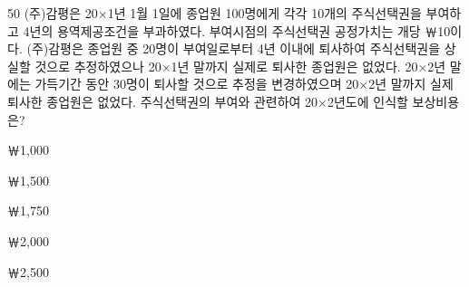 \begin{question}{50}
(주)감평은 20×1년 1월 1일에 종업원 100명에게 각각 10개의 주식선택권을 부여하고 4년의 용역제공조건을 부과하였다. 부여시점의 주식선택권 공정가치는 개당 ￦10이다. (주)감평은 종업원 중 20명이 부여일로부터 4년 이내에 퇴사하여 주식선택권을 상실할 것으로 추정하였으나 20×1년 말까지 실제로 퇴사한 종업원은 없었다. 20×2년 말에는 가득기간 동안 30명이 퇴사할 것으로 추정을 변경하였으며 20×2년 말까지 실제 퇴사한 종업원은 없었다. 주식선택권의 부여와 관련하여 20×2년도에 인식할 보상비용은?
\begin{choices}
  \item ￦1,000
  \item ￦1,500
  \item ￦1,750
  \item ￦2,000
  \item ￦2,500
\end{choices}
\end{question}

